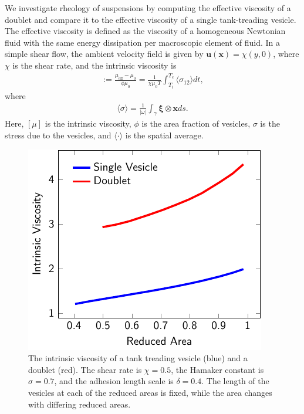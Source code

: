 \documentclass[aps,prl,twocolumn,showpacs,amsmath,amssymb]{revtex4-1}
\newcommand{\uu}{\mathbf{u}}
\newcommand{\xx}{\mathbf{x}}
\newcommand{\xxi}{\boldsymbol{\xi}}
\begin{document}
We investigate rheology of suspensions by computing the effective
viscosity of a doublet and compare it to the effective viscosity of a
single tank-treading vesicle. The effective viscosity is defined as the
viscosity of a homogeneous Newtonian fluid with the same energy
dissipation per macroscopic element of fluid.  In a simple shear flow,
the ambient velocity field is given by $\uu(\xx) = \chi(y,0)$, where
$\chi$ is the shear rate, and the intrinsic viscosity is
\begin{align*}
  [\mu]:= \frac{\mu_{\mathrm{eff}} - \mu_0}{\phi \mu_0} = 
  \frac{1}{\chi \mu_0 T} \int_{T_i}^{T_e} 
  \langle \sigma_{12} \rangle dt,
\end{align*}
where
\begin{align*}
  \langle \sigma \rangle = \frac{1}{|\omega|} \int_{\gamma}
    \xxi \otimes \xx ds.
\end{align*}
Here, $[\mu]$ is the intrinsic viscosity, $\phi$ is the area fraction of
vesicles, $\sigma$ is the stress due to the vesicles, and $\langle \cdot
\rangle$ is the spatial average.

\begin{figure}[htp]
  \includegraphics[scale=1]{figs/shear2Ves_adR4em1adS7em1Chi5em1.pdf}
  \caption{\label{fig:shearIntrinsicViscosity} The intrinsic viscosity
  of a tank treading vesicle (blue) and a doublet (red).  The shear rate
is $\chi = 0.5$, the Hamaker constant is $\sigma = 0.7$, and the
adhesion length scale is $\delta = 0.4$.  The length of the vesicles at
each of the reduced areas is fixed, while the area changes with
differing reduced areas.}
\end{figure}
\end{document}
